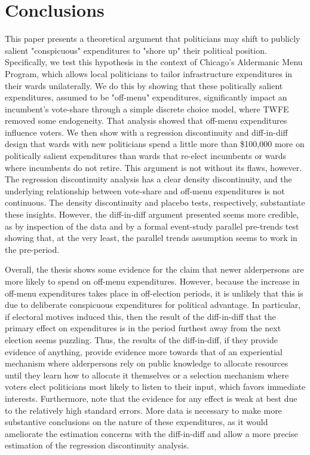 \section*{Conclusions}

This paper presents a theoretical argument that politicians may shift to publicly salient "conspicuous" expenditures to "shore up" their political position. 
Specifically, we test this hypothesis in the context of Chicago's Aldermanic Menu Program, which allows local politicians to tailor infrastructure expenditures in their wards unilaterally. 
We do this by showing that these politically salient expenditures, assumed to be "off-menu" expenditures, significantly impact an incumbent's vote-share through a simple discrete choice model, where TWFE removed some endogeneity. 
That analysis showed that off-menu expenditures influence voters. 
We then show with a regression discontinuity and diff-in-diff design that wards with new politicians spend a little more than \$100,000 more on politically salient expenditures than wards that re-elect incumbents or wards where incumbents do not retire. 
This argument is not without its flaws, however. 
The regression discontinuity analysis has a clear density discontinuity, and the underlying relationship between vote-share and off-menu expenditures is not continuous. 
The density discontinuity and placebo tests, respectively, substantiate these insights. 
However, the diff-in-diff argument presented seems more credible, as by inspection of the data and by a formal event-study parallel pre-trends test showing that, at the very least, the parallel trends assumption seems to work in the pre-period. 

Overall, the thesis shows some evidence for the claim that newer alderpersons are more likely to spend on off-menu expenditures. 
However, because the increase in off-menu expenditures takes place in off-election periods, it is unlikely that this is due to deliberate conspicuous expenditures for political advantage. 
In particular, if electoral motives induced this, then the result of the diff-in-diff that the primary effect on expenditures is in the period furthest away from the next election seems puzzling. 
Thus, the results of the diff-in-diff, if they provide evidence of anything, provide evidence more towards that of an experiential mechanism where alderpersons rely on public knowledge to allocate resources until they learn how to allocate it themselves or a selection mechanism where voters elect politicians most likely to listen to their input, which favors immediate interests. 
Furthermore, note that the evidence for any effect is weak at best due to the relatively high standard errors. 
More data is necessary to make more substantive conclusions on the nature of these expenditures, as it would ameliorate the estimation concerns with the diff-in-diff and allow a more precise estimation of the regression discontinuity analysis.
